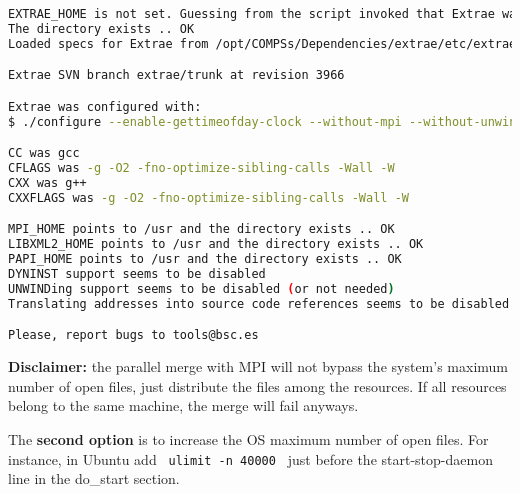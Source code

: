 \begin{lstlisting}[language=bash]
EXTRAE_HOME is not set. Guessing from the script invoked that Extrae was installed in /opt/COMPSs/Dependencies/extrae
The directory exists .. OK
Loaded specs for Extrae from /opt/COMPSs/Dependencies/extrae/etc/extrae-vars.sh

Extrae SVN branch extrae/trunk at revision 3966

Extrae was configured with:
$ ./configure --enable-gettimeofday-clock --without-mpi --without-unwind --without-dyninst --without-binutils --with-mpi=/usr --enable-parallel-merge --with-papi=/usr --with-java-jdk=/usr/lib/jvm/java-7-openjdk-amd64/ --disable-openmp --disable-nanos --disable-smpss --prefix=/opt/COMPSs/Dependencies/extrae --with-mpi=/usr --enable-parallel-merge --libdir=/opt/COMPSs/Dependencies/extrae/lib

CC was gcc
CFLAGS was -g -O2 -fno-optimize-sibling-calls -Wall -W
CXX was g++
CXXFLAGS was -g -O2 -fno-optimize-sibling-calls -Wall -W

MPI_HOME points to /usr and the directory exists .. OK
LIBXML2_HOME points to /usr and the directory exists .. OK
PAPI_HOME points to /usr and the directory exists .. OK
DYNINST support seems to be disabled
UNWINDing support seems to be disabled (or not needed)
Translating addresses into source code references seems to be disabled (or not needed)

Please, report bugs to tools@bsc.es
\end{lstlisting}

\textbf{Disclaimer:} the parallel merge with MPI will not bypass the system's maximum number of open files, just distribute the files among the resources. If all resources belong to the same machine, the merge will fail anyways.

\hfill

The \textbf{second option} is to increase the OS maximum number of open files. For instance, in Ubuntu add \texttt{ ulimit -n 40000 } just before the start-stop-daemon line in the do\_start section.





